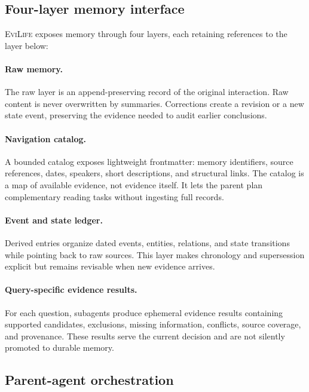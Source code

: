 \documentclass{article}
\newcommand{\method}{\textsc{EviLife}}
\begin{document}
\subsection{Four-layer memory interface}

\method{} exposes memory through four layers, each retaining references to the
layer below:

\paragraph{Raw memory.}
The raw layer is an append-preserving record of the original interaction. Raw
content is never overwritten by summaries. Corrections create a revision or a
new state event, preserving the evidence needed to audit earlier conclusions.

\paragraph{Navigation catalog.}
A bounded catalog exposes lightweight frontmatter: memory identifiers, source
references, dates, speakers, short descriptions, and structural links. The
catalog is a map of available evidence, not evidence itself. It lets the parent
plan complementary reading tasks without ingesting full records.

\paragraph{Event and state ledger.}
Derived entries organize dated events, entities, relations, and state
transitions while pointing back to raw sources. This layer makes chronology and
supersession explicit but remains revisable when new evidence arrives.

\paragraph{Query-specific evidence results.}
For each question, subagents produce ephemeral evidence results containing
supported candidates, exclusions, missing information, conflicts, source
coverage, and provenance. These results serve the current decision and are not
silently promoted to durable memory.

\subsection{Parent-agent orchestration}
\end{document}
